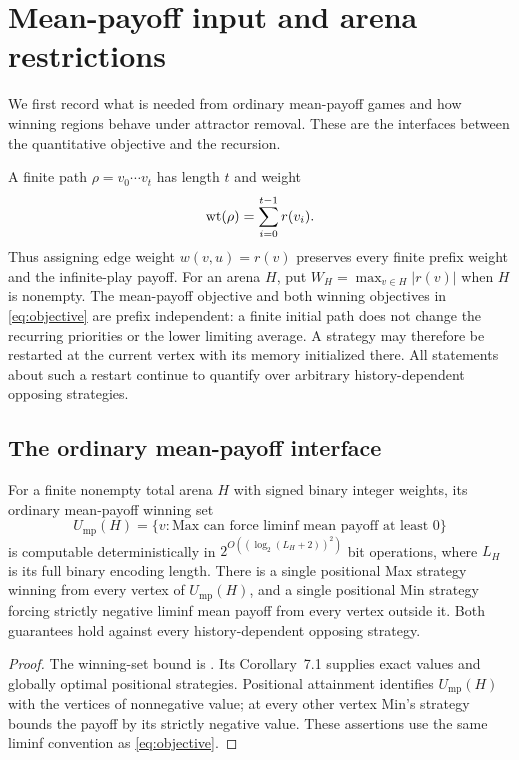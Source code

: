 \section{Mean-payoff input and arena restrictions}
\label{sec:arenas}

We first record what is needed from ordinary mean-payoff games and
how winning regions behave under attractor removal. These are the
interfaces between the quantitative objective and the recursion.

A finite path $\rho=v_0\cdots v_t$ has length $t$ and weight
\[
                  \operatorname{wt}(\rho)=\sum_{i=0}^{t-1}r(v_i).
\]
Thus assigning edge weight $w(v,u)=r(v)$ preserves every finite
prefix weight and the infinite-play payoff. For an arena $H$, put
$W_H=\max_{v\in H}|r(v)|$ when $H$ is nonempty.
The mean-payoff objective and both winning objectives in
\eqref{eq:objective} are prefix independent: a finite initial path
does not change the recurring priorities or the lower limiting
average. A strategy may therefore be restarted at the current vertex
with its memory initialized there. All statements about such a
restart continue to quantify over arbitrary history-dependent
opposing strategies.

\subsection{The ordinary mean-payoff interface}

\begin{proposition}\label{prop:mp-interface}
For a finite nonempty total arena $H$ with signed binary integer
weights, its ordinary mean-payoff winning set
\[
 U_{\mathrm{mp}}(H)=
 \{v:\text{Max can force liminf mean payoff at least }0\}
\]
is computable deterministically in
$2^{O((\log_2(L_H+2))^2)}$ bit operations, where $L_H$ is its full
binary encoding length. There is a single positional Max strategy
winning from every vertex of $U_{\mathrm{mp}}(H)$, and a single
positional Min strategy forcing strictly negative liminf mean payoff
from every vertex outside it. Both guarantees hold against every
history-dependent opposing strategy.
\end{proposition}

\begin{proof}
The winning-set bound is
\cite[Theorem~1.1]{OpenAI2026Deterministic}.
Its Corollary~7.1 supplies exact values and globally optimal
positional strategies. Positional attainment identifies
$U_{\mathrm{mp}}(H)$ with the vertices of nonnegative value; at every
other vertex Min's strategy bounds the payoff by its strictly
negative value. These assertions use the same liminf convention as
\eqref{eq:objective}.
\end{proof}

